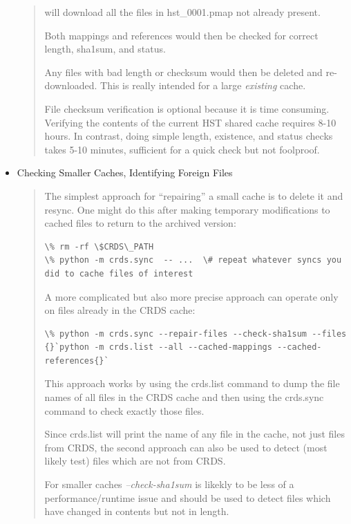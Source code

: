 \documentclass[letterpaper,10pt,english]{sphinxmanual}
\begin{document}
\begin{itemize}
\begin{quote}
will download all the files in hst\_0001.pmap not already present.

Both mappings and references would then be checked for correct length, sha1sum, and status.

Any files with bad length or checksum would then be deleted and re-downloaded.   This is really intended
for a large \emph{existing} cache.

File checksum verification is optional because it is time consuming.  Verifying the contents of the current
HST shared cache requires 8-10 hours.   In contrast, doing simple length, existence, and status checks
takes 5-10 minutes,  sufficient for a quick check but not foolproof.
\end{quote}

\item {} 
Checking Smaller Caches,  Identifying Foreign Files
\begin{quote}

The simplest approach for ``repairing'' a small cache is to delete it and resync.   One might do this
after making temporary modifications to cached files to return to the archived version:

\begin{Verbatim}[commandchars=\\\{\}]
\% rm -rf \$CRDS\_PATH
\% python -m crds.sync  -- ...  \# repeat whatever syncs you did to cache files of interest
\end{Verbatim}

A more complicated but also more precise approach can operate only on files already in the CRDS cache:

\begin{Verbatim}[commandchars=\\\{\}]
\% python -m crds.sync --repair-files --check-sha1sum --files {}`python -m crds.list --all --cached-mappings --cached-references{}`
\end{Verbatim}

This approach works by using the crds.list command to dump the file names of all files in the CRDS cache
and then using the crds.sync command to check exactly those files.

Since crds.list will print the name of any file in the cache,  not just files from CRDS,  the second approach can
also be used to detect (most likely test) files which are not from CRDS.

For smaller caches \emph{--check-sha1sum} is likekly to be less of a performance/runtime issue and should be used
to detect files which have changed in contents but not in length.
\end{quote}


\end{itemize}
\end{document}
